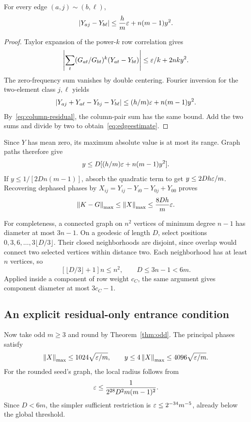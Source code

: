 \begin{lemma}\label{lem:edgebound}
For every edge $(a,j)\sim(b,\ell)$,
\begin{equation}\label{eq:edgeestimate}
 |Y_{aj}-Y_{b\ell}|\le\frac hm\varepsilon+n(m-1)y^2.
\end{equation}
\end{lemma}
\begin{proof}
Taylor expansion of the power-$k$ row correlation gives
\[
 \left|\sum_t(G_{at}/G_{bt})^k(Y_{at}-Y_{bt})\right|
 \le\varepsilon/k+2nky^2.
\]
The zero-frequency sum vanishes by double centering. Fourier inversion for the two-element class $j,\ell$ yields
\[
 |Y_{aj}+Y_{a\ell}-Y_{bj}-Y_{b\ell}|
 \le(h/m)\varepsilon+n(m-1)y^2.
\]
By~\eqref{eq:column-residual}, the column-pair sum has the same bound. Add the two sums and divide by two to obtain~\eqref{eq:edgeestimate}.
\end{proof}
Since $Y$ has mean zero, its maximum absolute value is at most its range. Graph paths therefore give
\[
 y\le D[(h/m)\varepsilon+n(m-1)y^2].
\]
If $y\le1/[2Dn(m-1)]$, absorb the quadratic term to get $y\le2Dh\varepsilon/m$. Recovering dephased phases by $X_{ij}=Y_{ij}-Y_{i0}-Y_{0j}+Y_{00}$ proves
\begin{equation}\label{eq:graphlinear}
 \left\lVert K-G\right\rVert_{\mathrm{max}}\le\left\lVert X\right\rVert_{\mathrm{max}}\le\frac{8Dh}{m}\varepsilon.
\end{equation}

For completeness, a connected graph on $n^2$ vertices of minimum degree $n-1$ has diameter at most $3n-1$. On a geodesic of length $D$, select positions $0,3,6,\ldots,3\lfloor D/3\rfloor$. Their closed neighborhoods are disjoint, since overlap would connect two selected vertices within distance two. Each neighborhood has at least $n$ vertices, so
\[
 [\lfloor D/3\rfloor+1]n\le n^2,\qquad D\le3n-1<6m.
\]
Applied inside a component of row weight $c_C$, the same argument gives component diameter at most $3c_C-1$.

\subsection{An explicit residual-only entrance condition}
Now take odd $m\ge3$ and round by Theorem~\ref{thm:odd}. The principal phases satisfy
\[
 \left\lVert X\right\rVert_{\mathrm{max}}\le1024\sqrt{\varepsilon/m},\qquad
 y\le4\left\lVert X\right\rVert_{\mathrm{max}}\le4096\sqrt{\varepsilon/m}.
\]
For the rounded seed's graph, the local radius follows from
\begin{equation}\label{eq:graphentrance}
 \varepsilon\le\frac1{2^{28}D^2m(m-1)^2}.
\end{equation}
Since $D<6m$, the simpler sufficient restriction is $\varepsilon\le2^{-34}m^{-5}$, already below the global threshold.

